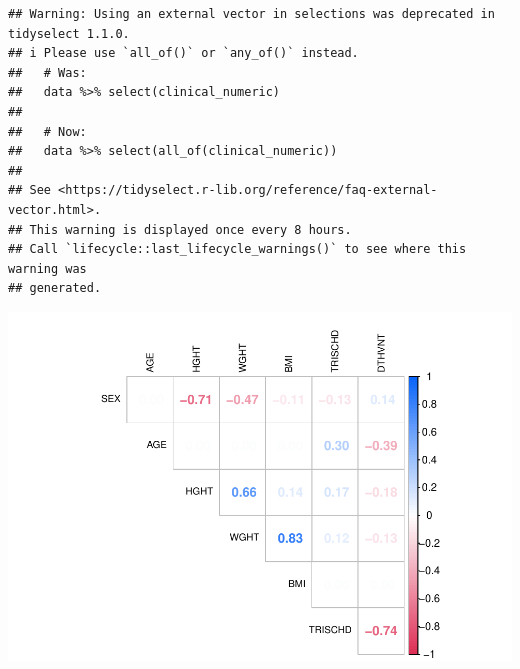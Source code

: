 \documentclass[
]{article}
\begin{document}
\begin{verbatim}
## Warning: Using an external vector in selections was deprecated in tidyselect 1.1.0.
## i Please use `all_of()` or `any_of()` instead.
##   # Was:
##   data %>% select(clinical_numeric)
## 
##   # Now:
##   data %>% select(all_of(clinical_numeric))
## 
## See <https://tidyselect.r-lib.org/reference/faq-external-vector.html>.
## This warning is displayed once every 8 hours.
## Call `lifecycle::last_lifecycle_warnings()` to see where this warning was
## generated.
\end{verbatim}

\includegraphics{Q1_markdown_files/figure-latex/unnamed-chunk-6-1.pdf}
\end{document}
